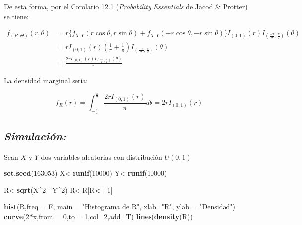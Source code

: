 \documentclass[]{article}
\newenvironment{Shaded}{\begin{snugshade}}{\end{snugshade}}
\newcommand{\KeywordTok}[1]{\textcolor[rgb]{0.13,0.29,0.53}{\textbf{#1}}}
\newcommand{\DataTypeTok}[1]{\textcolor[rgb]{0.13,0.29,0.53}{#1}}
\newcommand{\DecValTok}[1]{\textcolor[rgb]{0.00,0.00,0.81}{#1}}
\newcommand{\StringTok}[1]{\textcolor[rgb]{0.31,0.60,0.02}{#1}}
\newcommand{\OperatorTok}[1]{\textcolor[rgb]{0.81,0.36,0.00}{\textbf{#1}}}
\newcommand{\NormalTok}[1]{#1}
\begin{document}
De esta forma, por el Corolario 12.1 (\emph{Probability Essentials} de
Jacod \& Protter) se tiene:

\begin{equation}
\begin{split}
f_{(R,\Theta)}(r,\theta)&=r\{ f_{X,Y}(r\cos\theta,r\sin\theta) + f_{X,Y}(-r\cos\theta,-r\sin\theta)  \}
I_{(0,1)}(r)I_{\left(\frac{-\pi}{2},\frac{\pi}{2}\right)}(\theta)\\
&=rI_{(0,1)}(r)\left(\frac{1}{\pi}+\frac{1}{\pi}\right)I_{\left(\frac{-\pi}{2},\frac{\pi}{2}\right)}(\theta)\\
&=\frac{2rI_{(0,1)}(r)I_{\left(\frac{-\pi}{2},\frac{\pi}{2}\right)}(\theta)}{\pi}
\end{split}
\end{equation}

La densidad marginal sería:

\begin{equation}
f_R(r)=\int_{-\frac{\pi}{2}}^{\frac{\pi}{2}}\frac{2rI_{(0,1)}(r)}{\pi}d\theta=2rI_{(0,1)}(r)
\end{equation}

\newpage

\subsection{\texorpdfstring{\emph{Simulación:}}{Simulación:}}\label{simulacion}

Sean \(X\) y \(Y\) dos variables aleatorias con distribución \(U(0,1)\)

\begin{Shaded}
\begin{Highlighting}[]
\KeywordTok{set.seed}\NormalTok{(}\DecValTok{163053}\NormalTok{)}
\NormalTok{X<-}\KeywordTok{runif}\NormalTok{(}\DecValTok{10000}\NormalTok{)}
\NormalTok{Y<-}\KeywordTok{runif}\NormalTok{(}\DecValTok{10000}\NormalTok{)}

\NormalTok{R<-}\KeywordTok{sqrt}\NormalTok{(X}\OperatorTok{^}\DecValTok{2}\OperatorTok{+}\NormalTok{Y}\OperatorTok{^}\DecValTok{2}\NormalTok{)}
\NormalTok{R<-R[R}\OperatorTok{<=}\DecValTok{1}\NormalTok{]}

\KeywordTok{hist}\NormalTok{(R,}\DataTypeTok{freq =}\NormalTok{ F, }\DataTypeTok{main =} \StringTok{"Histograma de R"}\NormalTok{, }\DataTypeTok{xlab=}\StringTok{"R"}\NormalTok{, }\DataTypeTok{ylab =} \StringTok{"Densidad"}\NormalTok{)}
\KeywordTok{curve}\NormalTok{(}\DecValTok{2}\OperatorTok{*}\NormalTok{x,}\DataTypeTok{from =} \DecValTok{0}\NormalTok{,}\DataTypeTok{to =} \DecValTok{1}\NormalTok{,}\DataTypeTok{col=}\DecValTok{2}\NormalTok{,}\DataTypeTok{add=}\NormalTok{T)}
\KeywordTok{lines}\NormalTok{(}\KeywordTok{density}\NormalTok{(R))}
\end{Highlighting}
\end{Shaded}
\end{document}
